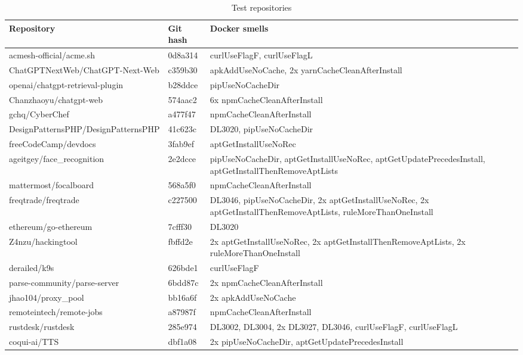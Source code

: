 \documentclass[conference]{IEEEtran}
\begin{document}
\begin{table}[h]
    \renewcommand{\arraystretch}{1.2}
    \caption{Test repositories}
    \label{tbl:repos}
    \centering
    \begin{tabularx}{\linewidth}{l|l|X}
        Repository & Git hash & Docker smells \\ \hline
        acmesh-official/acme.sh & 0d8a314 & curlUseFlagF, curlUseFlagL \\
        ChatGPTNextWeb/ChatGPT-Next-Web & c359b30 & apkAddUseNoCache, 2x yarnCacheCleanAfterInstall \\
        openai/chatgpt-retrieval-plugin & b28ddce & pipUseNoCacheDir \\
        Chanzhaoyu/chatgpt-web & 574aac2 & 6x npmCacheCleanAfterInstall \\
        gchq/CyberChef & a477f47 & npmCacheCleanAfterInstall \\
        DesignPatternsPHP/DesignPatternsPHP & 41c623c & DL3020, pipUseNoCacheDir \\
        freeCodeCamp/devdocs & 3fab9ef & aptGetInstallUseNoRec \\
        ageitgey/face\_recognition & 2e2dcce & pipUseNoCacheDir, aptGetInstallUseNoRec, aptGetUpdatePrecedesInstall, aptGetInstallThenRemoveAptLists \\
        mattermost/focalboard & 568a5f0 & npmCacheCleanAfterInstall \\
        freqtrade/freqtrade & c227500 & DL3046, pipUseNoCacheDir, 2x aptGetInstallUseNoRec, 2x aptGetInstallThenRemoveAptLists, ruleMoreThanOneInstall \\
        ethereum/go-ethereum & 7cfff30 & DL3020 \\
        Z4nzu/hackingtool & fbffd2e & 2x aptGetInstallUseNoRec, 2x aptGetInstallThenRemoveAptLists, 2x ruleMoreThanOneInstall \\
        derailed/k9s & 626bde1 & curlUseFlagF \\
        parse-community/parse-server & 6bdd87c & 2x npmCacheCleanAfterInstall \\
        jhao104/proxy\_pool & bb16a6f &  2x apkAddUseNoCache \\
        remoteintech/remote-jobs & a87987f & npmCacheCleanAfterInstall \\
        rustdesk/rustdesk & 285e974 & DL3002, DL3004, 2x DL3027, DL3046, curlUseFlagF, curlUseFlagL \\
        coqui-ai/TTS & dbf1a08 & 2x pipUseNoCacheDir, aptGetUpdatePrecedesInstall \\
    \end{tabularx}
 
\end{table}
\end{document}
